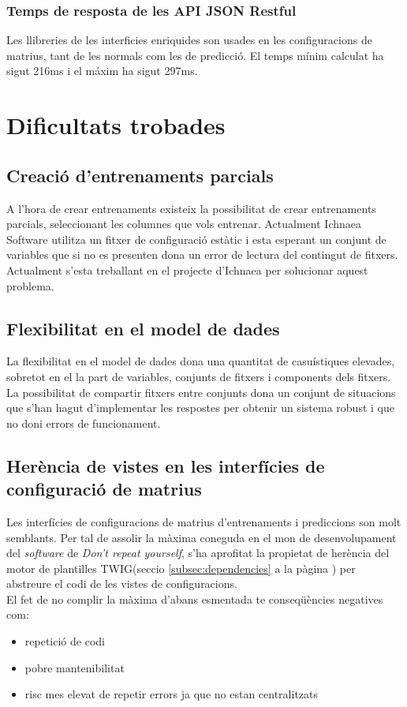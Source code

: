 \subsubsection{Temps de resposta de les API JSON Restful}
Les llibreries de les interficies enriquides son usades en les configuracions de matrius, tant de les normals com les de predicci\'{o}. El temps m\'{i}nim calculat ha sigut 216ms i el m\'{a}xim ha sigut 297ms.


\section{Dificultats trobades}
\label{sec:errorsKnown}

\subsection*{Creació d'entrenaments parcials}
A l'hora de crear entrenaments existeix la possibilitat de crear entrenaments parcials, seleccionant les columnes que vols entrenar. Actualment Ichnaea Software utilitza un fitxer de configuració estàtic i esta esperant un conjunt de variables que si no es presenten dona un error de lectura del contingut de fitxers.\\

Actualment s'esta treballant en el projecte d'Ichnaea per solucionar aquest problema.

\subsection*{Flexibilitat en el model de dades}
La flexibilitat en el model de dades dona una quantitat de casuístiques elevades, sobretot en el la part de variables, conjunts de fitxers i components dels fitxers.\\

La possibilitat de compartir fitxers entre conjunts dona un conjunt de situacions que s'han hagut d'implementar les respostes per obtenir un sistema robust i que no doni errors de funcionament.

\subsection*{Herència de vistes en les interfícies de configuració de matrius}
Les interfícies de configuracions de matrius d'entrenaments i prediccions son molt semblants. Per tal de assolir la màxima coneguda en el mon de desenvolupament del \textit{software} de \textit{Don't repeat yourself}\cite{dontrepeat}, s'ha aprofitat la propietat de herència del motor de plantilles TWIG(seccio \ref{subsec:dependencies} a la p\`{a}gina \pageref{subsec:dependencies}) per abstreure el codi de les vistes de configuracions.\cite{herency}\\

El fet de no complir la màxima d'abans esmentada te conseqüències negatives com:
\begin{itemize}
\item repetició de codi
\item pobre mantenibilitat
\item risc mes elevat de repetir errors ja que no estan centralitzats
\end{itemize}


